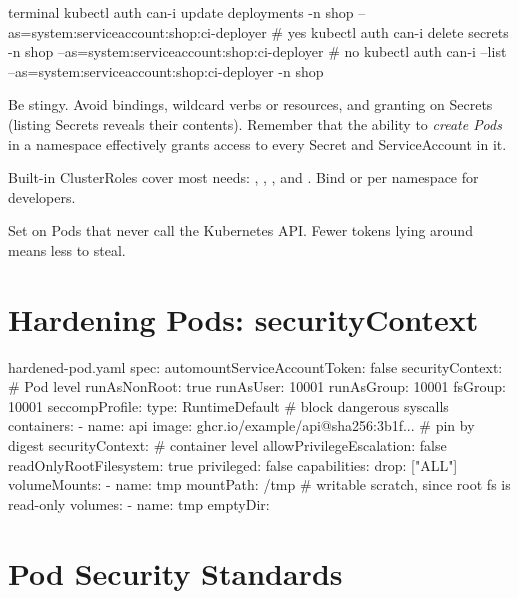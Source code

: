 \begin{bashcode}{terminal}
kubectl auth can-i update deployments -n shop --as=system:serviceaccount:shop:ci-deployer   # yes
kubectl auth can-i delete secrets -n shop --as=system:serviceaccount:shop:ci-deployer       # no
kubectl auth can-i --list --as=system:serviceaccount:shop:ci-deployer -n shop
\end{bashcode}

\begin{warningbox}
Be stingy. Avoid  bindings, wildcard  verbs or
resources, and granting  on Secrets (listing Secrets reveals their
contents). Remember that the ability to \emph{create Pods} in a namespace
effectively grants access to every Secret and ServiceAccount in it.
\end{warningbox}

Built-in ClusterRoles cover most needs: , , , and
. Bind  or  per namespace for developers.

\begin{protip}
Set  on Pods that never call the
Kubernetes API. Fewer tokens lying around means less to steal.
\end{protip}

\section{Hardening Pods: securityContext}

\begin{yamlcode}{hardened-pod.yaml}
spec:
  automountServiceAccountToken: false
  securityContext:                       # Pod level
    runAsNonRoot: true
    runAsUser: 10001
    runAsGroup: 10001
    fsGroup: 10001
    seccompProfile:
      type: RuntimeDefault               # block dangerous syscalls
  containers:
    - name: api
      image: ghcr.io/example/api@sha256:3b1f...   # pin by digest
      securityContext:                   # container level
        allowPrivilegeEscalation: false
        readOnlyRootFilesystem: true
        privileged: false
        capabilities:
          drop: ["ALL"]
      volumeMounts:
        - name: tmp
          mountPath: /tmp                # writable scratch, since root fs is read-only
  volumes:
    - name: tmp
      emptyDir: {}
\end{yamlcode}

\section{Pod Security Standards}

